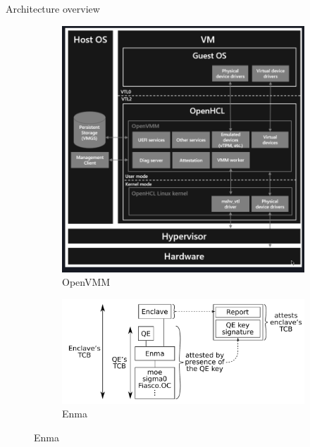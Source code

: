 \documentclass[aspectratio=169]{beamer}
\begin{document}
\begin{frame}{Architecture overview}
\begin{figure}
\begin{subfigure}[]{0.3\textwidth}
            \includegraphics[width=\textwidth]{images/openvmm.png}
            \caption{OpenVMM}
        \end{subfigure}
        \begin{subfigure}[]{0.3\textwidth}
            \includegraphics[width=\textwidth]{images/enma.png}
            \caption{Enma}
        \end{subfigure}
    \end{figure}
\end{frame}
\end{document}
